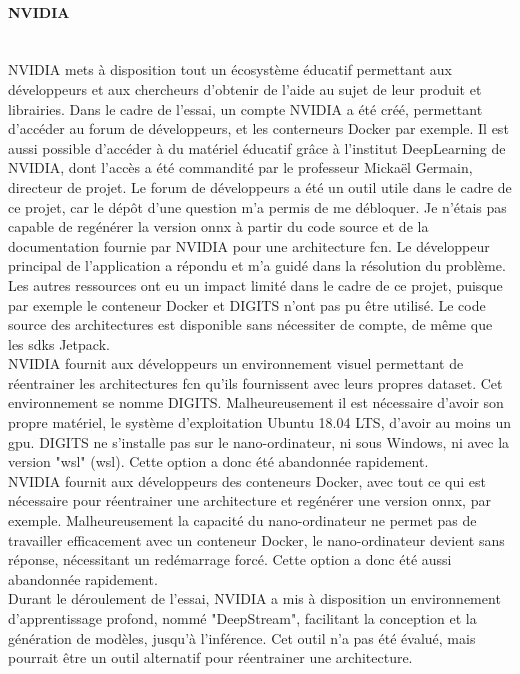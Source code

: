 \paragraph{NVIDIA}
\vspace{0.5\baselineskip}
\\
\noindent NVIDIA mets à disposition tout un écosystème éducatif permettant aux développeurs et aux chercheurs d'obtenir de l'aide au sujet de leur produit et librairies. Dans le cadre de l'essai, un compte NVIDIA a été créé, permettant d'accéder au forum de développeurs, et les conterneurs Docker par exemple. Il est aussi possible d'accéder à du matériel éducatif grâce à l'institut DeepLearning de NVIDIA, dont l'accès a été commandité par le professeur Mickaël Germain, directeur de projet. Le forum de développeurs a été un outil utile dans le cadre de ce projet, car le dépôt d'une question m'a permis de me débloquer. Je n'étais pas capable de regénérer la version \acrshort{onnx} à partir du code source et de la documentation fournie par NVIDIA pour une architecture \acrshort{fcn}. Le développeur principal de l'application a répondu et m'a guidé dans la résolution du problème. Les autres ressources ont eu un impact limité dans le cadre de ce projet, puisque par exemple le conteneur Docker et DIGITS n'ont pas pu être utilisé. Le code source des architectures est disponible sans nécessiter de compte, de même que les \acrshort{sdk}s Jetpack.
\vspace{0.5\baselineskip}
\\
\noindent NVIDIA fournit aux développeurs un environnement visuel permettant de réentrainer les architectures \acrshort{fcn} qu'ils fournissent avec leurs propres dataset. Cet environnement se nomme DIGITS. Malheureusement il est nécessaire d'avoir son propre matériel, le système d'exploitation Ubuntu 18.04 LTS, d'avoir au moins un \acrshort{gpu}. DIGITS ne s'installe pas sur le nano-ordinateur, ni sous Windows, ni avec la version "\acrshort{wsl}" (\acrlong{wsl}). Cette option a donc été abandonnée rapidement. 
\vspace{0.5\baselineskip}
\\
\noindent NVIDIA fournit aux développeurs des conteneurs Docker, avec tout ce qui est nécessaire pour réentrainer une architecture et regénérer une version \acrshort{onnx}, par exemple. Malheureusement la capacité du nano-ordinateur ne permet pas de travailler efficacement avec un conteneur Docker, le nano-ordinateur devient sans réponse, nécessitant un redémarrage forcé. Cette option a donc été aussi abandonnée rapidement. 
\vspace{0.5\baselineskip}
\\
\noindent Durant le déroulement de l'essai, NVIDIA a mis à disposition un environnement d'apprentissage profond, nommé "DeepStream", facilitant la conception et la génération de modèles, jusqu'à l'inférence. Cet outil n'a pas été évalué, mais pourrait être un outil alternatif pour réentrainer une architecture.